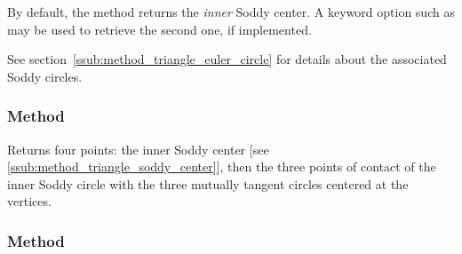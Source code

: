 \medskip

By default, the method returns the \emph{inner} Soddy center. A keyword option such as  may be used to retrieve the second one, if implemented.

\medskip

See  section~\ref{ssub:method_triangle_euler_circle} for details about the associated Soddy circles.

\vspace{1em}

\vspace{1em}
\begin{minipage}{.5\textwidth}
\end{minipage}
\begin{minipage}{.5\textwidth}
\begin{tkzexample}
\end{tkzexample}
\end{minipage}

\subsubsection{Method }
\label{ssub:method_triangle_soddy_points}

Returns four points: the inner Soddy center [see \ref{ssub:method_triangle_soddy_center}],
then the three points of contact of the inner Soddy circle with the three
mutually tangent circles centered at the vertices.

\begin{tkzexample}
\end{tkzexample}

\subsubsection{Method }
\label{ssub:method_triangle_conway_points}

